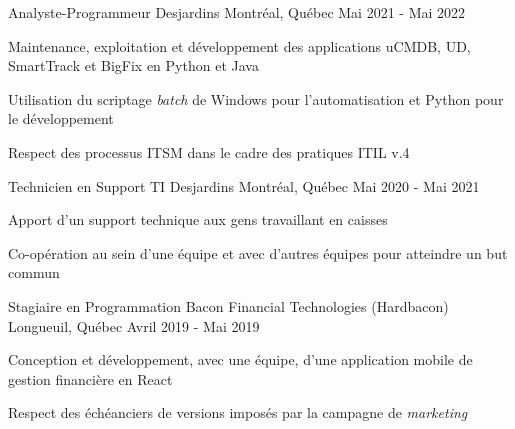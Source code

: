 

\begin{cventries}

  \cventry
    {Analyste-Programmeur} %
    {Desjardins} %
    {Montréal, Québec} %
    {Mai 2021 - Mai 2022} %
    {
      \begin{cvitems} %
        \item {Maintenance, exploitation et développement des applications uCMDB, UD, SmartTrack et BigFix en Python et Java}
        \item {Utilisation du scriptage \textit{batch} de Windows pour l'automatisation et Python pour le développement}
        \item {Respect des processus ITSM dans le cadre des pratiques ITIL v.4}
      \end{cvitems}
    }

  \cventry
    {Technicien en Support TI} %
    {Desjardins} %
    {Montréal, Québec} %
    {Mai 2020 - Mai 2021} %
    {
      \begin{cvitems} %
        \item {Apport d'un support technique aux gens travaillant en caisses}
        \item {Co-opération au sein d'une équipe et avec d'autres équipes pour atteindre un but commun}
      \end{cvitems}
    }
    
  \cventry
    {Stagiaire en Programmation} %
    {Bacon Financial Technologies (Hardbacon)} %
    {Longueuil, Québec} %
    {Avril 2019 - Mai 2019} %
    {
      \begin{cvitems} %
        \item {Conception et développement, avec une équipe, d'une application mobile de gestion financière en React}
        \item {Respect des échéanciers de versions imposés par la campagne de \textit{marketing}}
      \end{cvitems}
    }


\end{cventries}
